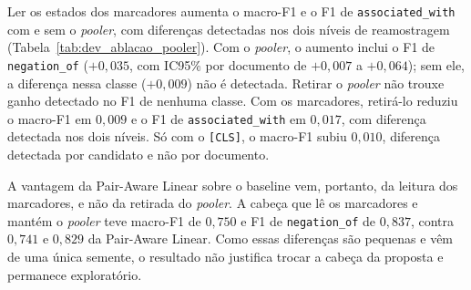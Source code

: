 

Ler os estados dos marcadores aumenta o macro-F1 e o F1 de
\texttt{associated\_with} com e sem o \emph{pooler}, com diferenças detectadas nos
dois níveis de reamostragem (Tabela~\ref{tab:dev_ablacao_pooler}). Com o
\emph{pooler}, o aumento inclui o F1 de \texttt{negation\_of} ($+0{,}035$, com
IC95\% por documento de $+0{,}007$ a $+0{,}064$); sem ele, a diferença nessa classe
($+0{,}009$) não é detectada. Retirar o \emph{pooler} não trouxe ganho detectado no
F1 de nenhuma classe. Com os marcadores, retirá-lo reduziu o macro-F1 em $0{,}009$ e o
F1 de \texttt{associated\_with} em $0{,}017$, com diferença detectada nos dois
níveis. Só com o \texttt{[CLS]}, o macro-F1 subiu $0{,}010$, diferença detectada por
candidato e não por documento.



A vantagem da Pair-Aware Linear sobre o baseline vem, portanto, da leitura dos
marcadores, e não da retirada do \emph{pooler}. A cabeça que lê os marcadores e
mantém o \emph{pooler} teve macro-F1 de $0{,}750$ e F1 de \texttt{negation\_of} de
$0{,}837$, contra $0{,}741$ e $0{,}829$ da Pair-Aware Linear. Como essas diferenças
são pequenas e vêm de uma única semente, o resultado não justifica trocar a cabeça
da proposta e permanece exploratório.
